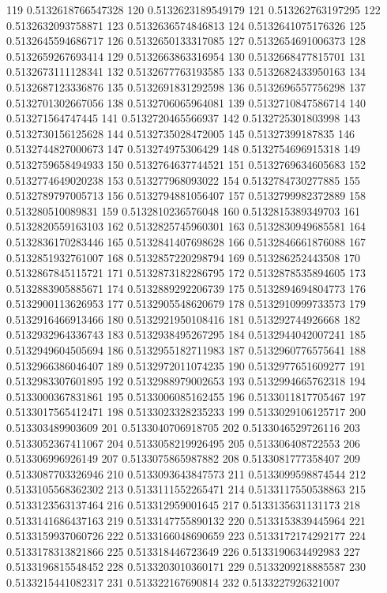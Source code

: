 119 0.5132618766547328
120 0.5132623189549179
121 0.513262763197295
122 0.5132632093758871
123 0.5132636574846813
124 0.5132641075176326
125 0.5132645594686717
126 0.5132650133317085
127 0.5132654691006373
128 0.5132659267693414
129 0.5132663863316954
130 0.5132668477815701
131 0.5132673111128341
132 0.5132677763193585
133 0.5132682433950163
134 0.5132687123336876
135 0.5132691831292598
136 0.5132696557756298
137 0.5132701302667056
138 0.5132706065964081
139 0.5132710847586714
140 0.513271564747445
141 0.5132720465566937
142 0.5132725301803998
143 0.5132730156125628
144 0.5132735028472005
145 0.51327399187835
146 0.5132744827000673
147 0.513274975306429
148 0.5132754696915318
149 0.5132759658494933
150 0.5132764637744521
151 0.5132769634605683
152 0.5132774649020238
153 0.513277968093022
154 0.5132784730277885
155 0.5132789797005713
156 0.5132794881056407
157 0.5132799982372889
158 0.513280510089831
159 0.5132810236576048
160 0.5132815389349703
161 0.5132820559163103
162 0.5132825745960301
163 0.5132830949685581
164 0.5132836170283446
165 0.5132841407698628
166 0.5132846661876088
167 0.5132851932761007
168 0.5132857220298794
169 0.513286252443508
170 0.5132867845115721
171 0.5132873182286795
172 0.5132878535894605
173 0.5132883905885671
174 0.5132889292206739
175 0.5132894694804773
176 0.5132900113626953
177 0.5132905548620679
178 0.5132910999733573
179 0.5132916466913466
180 0.5132921950108416
181 0.513292744926668
182 0.5132932964336743
183 0.5132938495267295
184 0.5132944042007241
185 0.5132949604505694
186 0.5132955182711983
187 0.5132960776575641
188 0.5132966386046407
189 0.5132972011074235
190 0.5132977651609277
191 0.5132983307601895
192 0.5132988979002653
193 0.5132994665762318
194 0.5133000367831861
195 0.5133006085162455
196 0.5133011817705467
197 0.5133017565412471
198 0.5133023328235233
199 0.5133029106125717
200 0.513303489903609
201 0.5133040706918705
202 0.5133046529726116
203 0.5133052367411067
204 0.5133058219926495
205 0.513306408722553
206 0.513306996926149
207 0.5133075865987882
208 0.5133081777358407
209 0.5133087703326946
210 0.5133093643847573
211 0.5133099598874544
212 0.5133105568362302
213 0.5133111552265471
214 0.5133117550538863
215 0.5133123563137464
216 0.513312959001645
217 0.5133135631131173
218 0.5133141686437163
219 0.5133147755890132
220 0.5133153839445964
221 0.5133159937060726
222 0.5133166048690659
223 0.5133172174292177
224 0.5133178313821866
225 0.513318446723649
226 0.5133190634492983
227 0.5133196815548452
228 0.5133203010360171
229 0.5133209218885587
230 0.5133215441082317
231 0.513322167690814
232 0.5133227926321007
